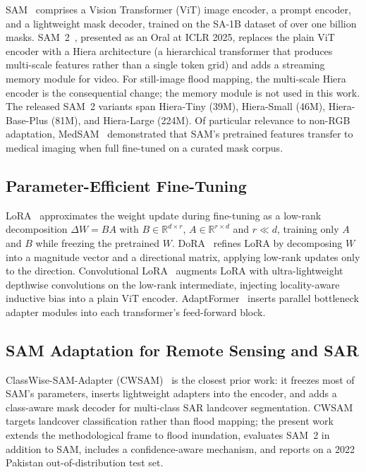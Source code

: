\documentclass[conference]{IEEEtran}
\begin{document}
SAM~\cite{Kirillov2023SAM} comprises a Vision Transformer (ViT) image encoder, a prompt encoder, and a lightweight mask decoder, trained on the SA-1B dataset of over one billion masks. SAM~2~\cite{Ravi2025SAM2}, presented as an Oral at ICLR 2025, replaces the plain ViT encoder with a Hiera architecture (a hierarchical transformer that produces multi-scale features rather than a single token grid) and adds a streaming memory module for video. For still-image flood mapping, the multi-scale Hiera encoder is the consequential change; the memory module is not used in this work. The released SAM~2 variants span Hiera-Tiny (39M), Hiera-Small (46M), Hiera-Base-Plus (81M), and Hiera-Large (224M). Of particular relevance to non-RGB adaptation, MedSAM~\cite{Ma2024MedSAM} demonstrated that SAM's pretrained features transfer to medical imaging when full fine-tuned on a curated mask corpus.

\subsection{Parameter-Efficient Fine-Tuning}

LoRA~\cite{Hu2022LoRA} approximates the weight update during fine-tuning as a low-rank decomposition $\Delta W = BA$ with $B \in \mathbb{R}^{d\times r}$, $A \in \mathbb{R}^{r\times d}$ and $r \ll d$, training only $A$ and $B$ while freezing the pretrained $W$. DoRA~\cite{Liu2024DoRA} refines LoRA by decomposing $W$ into a magnitude vector and a directional matrix, applying low-rank updates only to the direction. Convolutional LoRA~\cite{Zhong2024ConvLoRA} augments LoRA with ultra-lightweight depthwise convolutions on the low-rank intermediate, injecting locality-aware inductive bias into a plain ViT encoder. AdaptFormer~\cite{Chen2022AdaptFormer} inserts parallel bottleneck adapter modules into each transformer's feed-forward block.

\subsection{SAM Adaptation for Remote Sensing and SAR}

ClassWise-SAM-Adapter (CWSAM)~\cite{Pu2025CWSAM} is the closest prior work: it freezes most of SAM's parameters, inserts lightweight adapters into the encoder, and adds a class-aware mask decoder for multi-class SAR landcover segmentation. CWSAM targets landcover classification rather than flood mapping; the present work extends the methodological frame to flood inundation, evaluates SAM~2 in addition to SAM, includes a confidence-aware mechanism, and reports on a 2022 Pakistan out-of-distribution test set.
\end{document}
